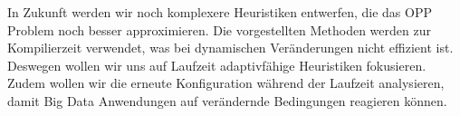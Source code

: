 \documentclass{article}
\begin{document}
In Zukunft werden wir noch komplexere Heuristiken entwerfen, die das OPP Problem noch besser approximieren. 
Die vorgestellten Methoden werden zur Kompilierzeit verwendet, was bei dynamischen Veränderungen nicht effizient ist. 
Deswegen wollen wir uns auf Laufzeit adaptivfähige Heuristiken fokusieren. 
Zudem wollen wir die erneute Konfiguration während der Laufzeit analysieren, damit Big Data Anwendungen auf verändernde Bedingungen reagieren können. 



\newpage

\end{document}
